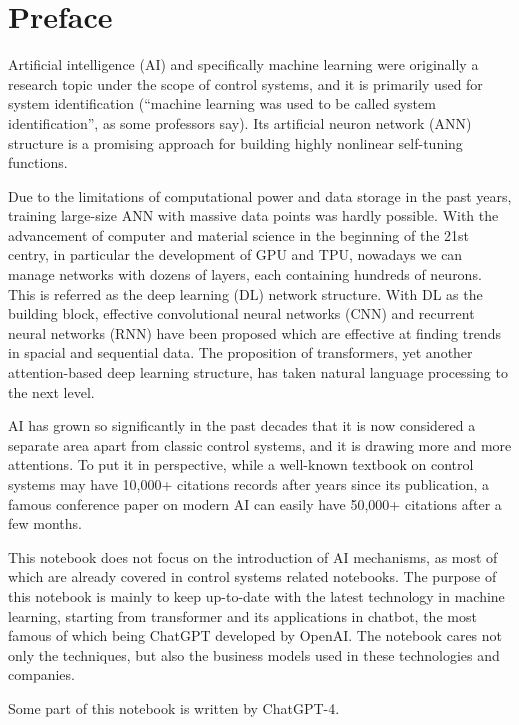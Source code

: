 \chapter*{Preface}

Artificial intelligence (AI) and specifically machine learning were originally a research topic under the scope of control systems, and it is primarily used for system identification (``machine learning was used to be called system identification'', as some professors say). Its artificial neuron network (ANN) structure is a promising approach for building highly nonlinear self-tuning functions.

Due to the limitations of computational power and data storage in the past years, training large-size ANN with massive data points was hardly possible. With the advancement of computer and material science in the beginning of the 21st centry, in particular the development of GPU and TPU, nowadays we can manage networks with dozens of layers, each containing hundreds of neurons. This is referred as the deep learning (DL) network structure. With DL as the building block, effective convolutional neural networks (CNN) and recurrent neural networks (RNN) have been proposed which are effective at finding trends in spacial and sequential data. The proposition of transformers, yet another attention-based deep learning structure, has taken natural language processing to the next level.

AI has grown so significantly in the past decades that it is now considered a separate area apart from classic control systems, and it is drawing more and more attentions. To put it in perspective, while a well-known textbook on control systems may have 10,000+ citations records after years since its publication, a famous conference paper on modern AI can easily have 50,000+ citations after a few months.

This notebook does not focus on the introduction of AI mechanisms, as most of which are already covered in control systems related notebooks. The purpose of this notebook is mainly to keep up-to-date with the latest technology in machine learning, starting from transformer and its applications in chatbot, the most famous of which being ChatGPT developed by OpenAI. The notebook cares not only the techniques, but also the business models used in these technologies and companies.

Some part of this notebook is written by ChatGPT-4.